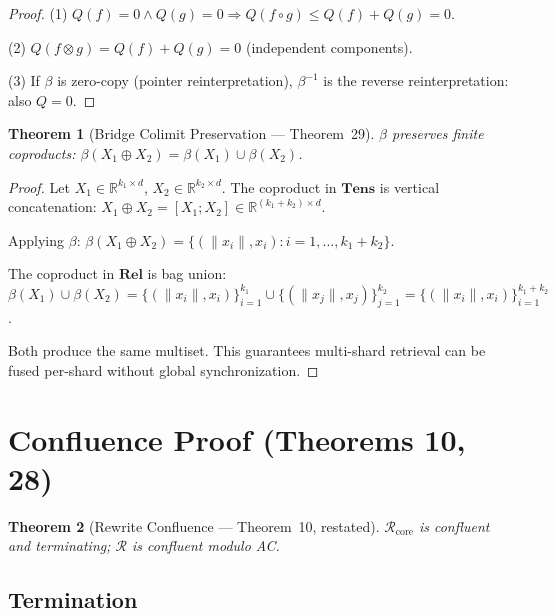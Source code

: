 \documentclass{article}
\newtheorem{theorem}{Theorem}
\theoremstyle{definition}
\theoremstyle{remark}
\begin{document}
\begin{proof}
(1) $Q(f) = 0 \wedge Q(g) = 0 \Rightarrow Q(f \circ g) \leq Q(f) + Q(g) = 0$.

(2) $Q(f \otimes g) = Q(f) + Q(g) = 0$ (independent components).

(3) If $\beta$ is zero-copy (pointer reinterpretation), $\beta^{-1}$ is the reverse reinterpretation: also $Q = 0$.
\end{proof}

\begin{theorem}[Bridge Colimit Preservation --- Theorem~29]\label{thm:colimit-app}
$\beta$ preserves finite coproducts: $\beta(X_1 \oplus X_2) = \beta(X_1) \cup \beta(X_2)$.
\end{theorem}

\begin{proof}
Let $X_1 \in \mathbb{R}^{k_1 \times d}$, $X_2 \in \mathbb{R}^{k_2 \times d}$. The coproduct in $\mathbf{Tens}$ is vertical concatenation: $X_1 \oplus X_2 = [X_1; X_2] \in \mathbb{R}^{(k_1+k_2) \times d}$.

Applying $\beta$: $\beta(X_1 \oplus X_2) = \{(\|x_i\|, x_i) : i = 1,\ldots,k_1+k_2\}$.

The coproduct in $\mathbf{Rel}$ is bag union: $\beta(X_1) \cup \beta(X_2) = \{(\|x_i\|,x_i)\}_{i=1}^{k_1} \cup \{(\|x_j\|,x_j)\}_{j=1}^{k_2} = \{(\|x_i\|,x_i)\}_{i=1}^{k_1+k_2}$.

Both produce the same multiset. This guarantees multi-shard retrieval can be fused per-shard without global synchronization.
\end{proof}

\section{Confluence Proof (Theorems 10, 28)}\label{app:confluence-proof}

\begin{theorem}[Rewrite Confluence --- Theorem~10, restated]\label{thm:confluence-full}
$\mathcal{R}_{\mathrm{core}}$ is confluent and terminating; $\mathcal{R}$ is confluent modulo AC.
\end{theorem}

\subsection{Termination}
\end{document}
